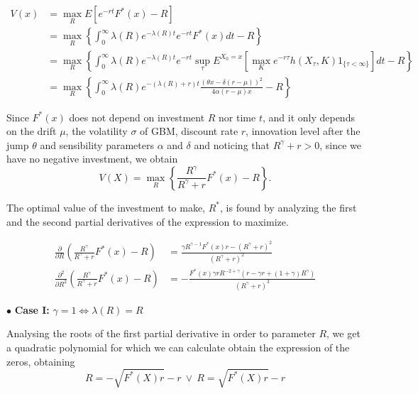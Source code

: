 \begin{align*}
V(x) &=\max_R E \left[ e^{-rt} F^*(x) -R \right]\\
& =  \max_R  \left\{ \int_0 ^\infty \lambda(R) e^{-\lambda(R)t} e^{-rt} F^*(x) dt -R \right\} \\
&= \max_R \left\{ \int_0 ^\infty \lambda(R) e^{-\lambda(R)t} e^{-rt} 
\sup_\tau E ^{X_0=x}\left[\max_K e^{-r\tau}h(X_\tau,K) 1_{\{\tau<\infty\}} \right]
dt -R \right\} \\
&= \max_R \left\{  \int_0 ^\infty \lambda(R) e^{-(\lambda(R)+r)t} \frac{(\theta x -\delta (r-\mu))^2}{4 \alpha (r-\mu) x} -R \right\}
\end{align*}




Since $F^*(x)$ does not depend on investment $R$ nor time $t$, and it only depends on the drift $\mu$, the volatility $\sigma$ of GBM, discount rate $r$, innovation level after the jump $\theta$ and sensibility parameters $\alpha$ and $\delta$ and noticing that $R^\gamma+r>0$, since we have no negative investment, we obtain
$$ V(X) =\max_R \left\{ \frac{R^\gamma}{R^\gamma+r} F^*(x) -R \right\}.$$

The optimal value of the investment to make, $R^*$, is found by analyzing the first and the second partial derivatives of the expression to maximize.

\begin{align*}
\frac{\partial}{\partial R} \left( \frac{R^\gamma}{R^\gamma+r} F^*(x) -R \right) &= \frac{\gamma R^{\gamma-1}F^*(x)r-(R^\gamma+r)^2}{(R^\gamma+r)^2}\\
\frac{\partial^2}{\partial R^2} \left( \frac{R^\gamma}{R^\gamma+r} F^*(x) -R \right) &=
-\frac{F^*(x) \gamma r R^{-2+\gamma}(r-\gamma r+(1+\gamma)R^\gamma)}{(R^\gamma+r)^3}
\end{align*}



$\bullet$ \textbf{Case I:} $\gamma=1 \Leftrightarrow \lambda(R)=R$

Analysing the roots of the first partial derivative in order to parameter $R$, we get a quadratic polynomial for which we can calculate obtain the expression of the zeros, obtaining
$$  R=-\sqrt{F^*(X)r}-r \  \vee \ R=\sqrt{F^*(X)r}-r$$

